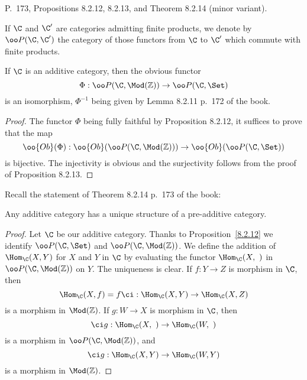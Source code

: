 \documentclass[12pt]{article}
\theoremstyle{remark}
\theoremstyle{definition}
\begin{document}
\begin{s}
P.~173, Propositions 8.2.12, 8.2.13, and Theorem 8.2.14  (minor variant). 
\begin{nota}
If $\C$ and $\C'$ are categories admitting finite products, we denote by $\oo P(\C,\C')$ the category of those functors from $\C$ to $\C'$ which commute with finite products.
\end{nota}

\begin{prop}
If $\C$ is an additive category, then the obvious functor 
$$
\Phi:\oo P(\C,\Mod(\mathbb Z))\to\oo P(\C,\Set)
$$ 
is an isomorphism, $\Phi^{-1}$ being given by Lemma 8.2.11 p.~172 of the book.
\end{prop}

\begin{proof}
The functor $\Phi$ being fully faithful by Proposition 8.2.12, it suffices to prove that the map 
$$
\oo{Ob}(\Phi):\oo{Ob}(\oo P(\C,\Mod(\mathbb Z)))\to\oo{Ob}(\oo P(\C,\Set))
$$ 
is bijective. The injectivity is obvious and the surjectivity follows from the proof of Proposition 8.2.13.
\end{proof}

Recall the statement of Theorem 8.2.14 p.~173 of the book:

\begin{thm}[Theorem 8.2.14 p. 173] 
Any additive category has a unique structure of a pre-additive category.
\end{thm}

\begin{proof}
Let $\C$ be our additive category. Thanks to Proposition~\ref{8.2.12} we identify $\oo P(\C,\Set)$ and $\oo P(\C,\Mod(\mathbb Z))$. We define the addition of $\Hom_\C(X,Y)$ for $X$ and $Y$ in $\C$ by evaluating the functor $\Hom_\C(X,\ )$ in $\oo P(\C,\Mod(\mathbb Z))$ on $Y$. The uniqueness is clear. If $f:Y\to Z$ is morphism in $\C$, then 
$$
\Hom_\C(X,f)=f\ci:\Hom_\C(X,Y)\to\Hom_\C(X,Z)
$$ 
is a morphism in $\Mod(\mathbb Z)$. If $g:W\to X$ is morphism in $\C$, then 
$$
\ci g:\Hom_\C(X,\ )\to\Hom_\C(W,\ )
$$ 
is a morphism in $\oo P(\C,\Mod(\mathbb Z))$, and 
$$
\ci g:\Hom_\C(X,Y)\to\Hom_\C(W,Y)
$$ 
is a morphism in $\Mod(\mathbb Z)$.
\end{proof}
\end{s}

%
\end{document}

